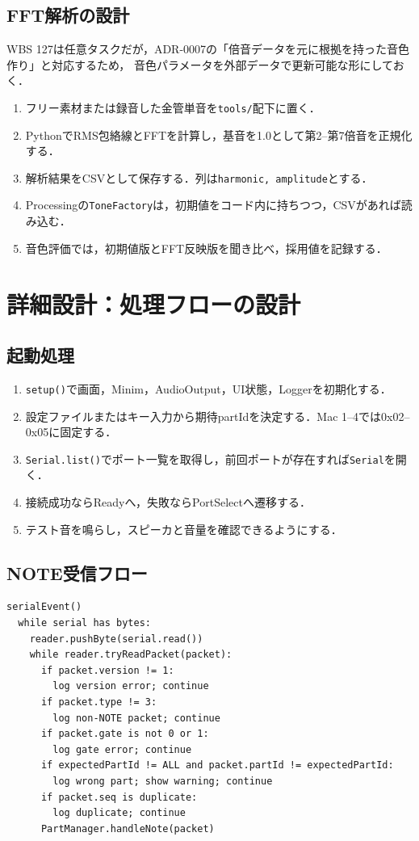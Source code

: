 \documentclass[a4paper,11pt]{jsarticle}
\begin{document}
\subsection{FFT解析の設計}

WBS 127は任意タスクだが，ADR-0007の「倍音データを元に根拠を持った音色作り」と対応するため，
音色パラメータを外部データで更新可能な形にしておく．

\begin{enumerate}
\item フリー素材または録音した金管単音を\texttt{tools/}配下に置く．
\item PythonでRMS包絡線とFFTを計算し，基音を1.0として第2--第7倍音を正規化する．
\item 解析結果をCSVとして保存する．列は\texttt{harmonic, amplitude}とする．
\item Processingの\texttt{ToneFactory}は，初期値をコード内に持ちつつ，CSVがあれば読み込む．
\item 音色評価では，初期値版とFFT反映版を聞き比べ，採用値を記録する．
\end{enumerate}

\section{詳細設計：処理フローの設計}

\subsection{起動処理}

\begin{enumerate}
\item \texttt{setup()}で画面，Minim，AudioOutput，UI状態，Loggerを初期化する．
\item 設定ファイルまたはキー入力から期待partIdを決定する．Mac 1--4では0x02--0x05に固定する．
\item \texttt{Serial.list()}でポート一覧を取得し，前回ポートが存在すれば\texttt{Serial}を開く．
\item 接続成功ならReadyへ，失敗ならPortSelectへ遷移する．
\item テスト音を鳴らし，スピーカと音量を確認できるようにする．
\end{enumerate}

\subsection{NOTE受信フロー}

\begin{lstlisting}[style=textdiagram, caption={Serial受信から発音までの処理フロー}]
serialEvent()
  while serial has bytes:
    reader.pushByte(serial.read())
    while reader.tryReadPacket(packet):
      if packet.version != 1:
        log version error; continue
      if packet.type != 3:
        log non-NOTE packet; continue
      if packet.gate is not 0 or 1:
        log gate error; continue
      if expectedPartId != ALL and packet.partId != expectedPartId:
        log wrong part; show warning; continue
      if packet.seq is duplicate:
        log duplicate; continue
      PartManager.handleNote(packet)
\end{lstlisting}
\end{document}
